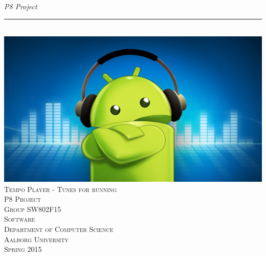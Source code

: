 \thispagestyle{empty}
\begin{flushright}
\vspace{3cm}

\phantom{hul}

\phantom{hul}

\phantom{hul}

\textsl{P8 Project} \\ \vspace{1cm}

\rule{1\textwidth}{3mm} \\ \vspace{1.5cm}
\includegraphics[width=\textwidth]{Images/frontpage.jpg}
\vspace{1.5cm} \\
\textsc{\Large Tempo Player - Tunes for running \\
P8 Project\\
Group SW802F15\\
Software\\
Department of Computer Science\\
Aalborg University\\
Spring 2015\\
~\\
}

\end{flushright}
